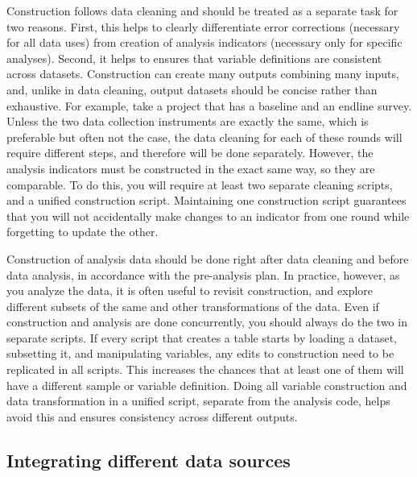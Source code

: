 Construction follows data cleaning and 
should be treated as a separate task for two reasons.
First, this helps to clearly differentiate error corrections 
(necessary for all data uses)
from creation of analysis indicators 
(necessary only for specific analyses).
Second, it helps to ensures that variable definitions are
consistent across datasets.
Construction can create many outputs combining many inputs,
and, unlike in data cleaning,
output datasets should be concise rather than exhaustive.
For example, take a project that has a baseline and an endline survey.
Unless the two data collection instruments are exactly the same,
which is preferable but often not the case,
the data cleaning for each of these rounds will require different steps,
and therefore will be done separately.
However, the analysis indicators must be constructed in the exact same way,
so they are comparable.
To do this, you will require at least two separate cleaning scripts,
and a unified construction script.
Maintaining one construction script guarantees that you will not
accidentally make changes to an indicator from one round
while forgetting to update the other.

Construction of analysis data should be done right
after data cleaning and before data analysis,
in accordance with the pre-analysis plan.
In practice, however, as you analyze the data,
it is often useful to revisit construction,
and explore different subsets of the same and other transformations of the data.
Even if construction and analysis are done concurrently,
you should always do the two in separate scripts.
If every script that creates a table starts by loading a dataset,
subsetting it, and manipulating variables,
any edits to construction need to be replicated in all scripts.
This increases the chances that at least one of them
will have a different sample or variable definition.
Doing all variable construction and data transformation
in a unified script, separate from the analysis code, helps
avoid this and ensures consistency across different outputs.

\subsection{Integrating different data sources}

